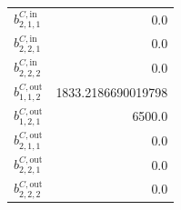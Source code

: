 \documentclass{article}%
\begin{document}
\begin{multicols*}{3}
\begin{supertabular}{lr}
	$b_{2,1,1}^{C,\text{in}}$ & 0.0 \\%
	$b_{2,2,1}^{C,\text{in}}$ & 0.0 \\%
	$b_{2,2,2}^{C,\text{in}}$ & 0.0 \\%
	$b_{1,1,2}^{C,\text{out}}$ & 1833.2186690019798 \\%
	$b_{1,2,1}^{C,\text{out}}$ & 6500.0 \\%
	$b_{2,1,1}^{C,\text{out}}$ & 0.0 \\%
	$b_{2,2,1}^{C,\text{out}}$ & 0.0 \\%
	$b_{2,2,2}^{C,\text{out}}$ & 0.0 \\%
\end{supertabular}%
\end{multicols*}%
\end{document}
